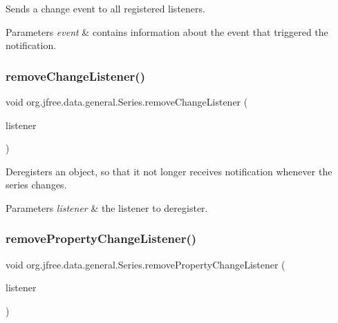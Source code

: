 Sends a change event to all registered listeners.


\begin{DoxyParams}{Parameters}
{\em event} & contains information about the event that triggered the notification. \\
\hline
\end{DoxyParams}
\mbox{\label{classorg_1_1jfree_1_1data_1_1general_1_1_series_ac3a253a273213a76b06f6a3b632457bb}} 
\subsubsection{\texorpdfstring{remove\+Change\+Listener()}{removeChangeListener()}}
{\footnotesize\ttfamily void org.\+jfree.\+data.\+general.\+Series.\+remove\+Change\+Listener (\begin{DoxyParamCaption}\item[{\mbox{\hyperlink{interfaceorg_1_1jfree_1_1data_1_1general_1_1_series_change_listener}{Series\+Change\+Listener}}}]{listener }\end{DoxyParamCaption})}

Deregisters an object, so that it not longer receives notification whenever the series changes.


\begin{DoxyParams}{Parameters}
{\em listener} & the listener to deregister. \\
\hline
\end{DoxyParams}
\mbox{\label{classorg_1_1jfree_1_1data_1_1general_1_1_series_a6a5826407b91adae3f21b50596450919}} 
\subsubsection{\texorpdfstring{remove\+Property\+Change\+Listener()}{removePropertyChangeListener()}}
{\footnotesize\ttfamily void org.\+jfree.\+data.\+general.\+Series.\+remove\+Property\+Change\+Listener (\begin{DoxyParamCaption}\item[{Property\+Change\+Listener}]{listener }\end{DoxyParamCaption})}

